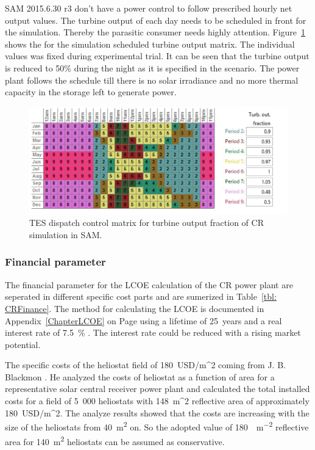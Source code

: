 SAM 2015.6.30 r3 don't have a power control to follow prescribed hourly net output values. The turbine output of each day needs to be scheduled in front for the simulation. Thereby the parasitic consumer needs highly attention. Figure~\ref{CR_turbineoutput} shows the for the simulation scheduled turbine output matrix. The individual values was fixed during experimental trial. It can be seen that the turbine output is reduced to 50\% during the night as it is specified in the scenario. The power plant follows the schedule till there is no solar irradiance and no more thermal capacity in the storage left to generate power. 
\begin{figure}[htbp]  
\centering
\includegraphics[width=0.95\linewidth]{FIG/CR_turbineoutput}
\caption[TES dispatch control matrix for turbine output fraction of CR simulation in SAM.]{TES dispatch control matrix for turbine output fraction of CR simulation in SAM.}\label{CR_turbineoutput}
\end{figure}
\pagebreak
\subsubsection{Financial parameter}
The financial parameter for the LCOE calculation of the CR power plant are seperated in different specific cost parts and are sumerized in Table~\ref{tbl: CRFinance}. The method for calculating the LCOE is documented in Appendix~\ref{ChapterLCOE} on Page \pageref{ChapterLCOE} using a lifetime of \SI{25}{years} and a real interest rate of 7.5~\% \cite{FraunhoferISE2013}. The interest rate could be reduced with a rising market potential.



The specific costs of the heliostat field of \SI{180}{USD/m}^2 coming from J. B. Blackmon \cite{Blackmon2012}. He analyzed the costs of heliostat as a function of area for a representative solar central receiver power plant and calculated the total installed costs for a field of 5~000 heliostats with \SI{148}{m}^2 reflective area of approximately \SI{180}{USD/m}^2. The analyze results showed that the costs are increasing with the size of the heliostats from \SI{40}{\square\metre} on. So the adopted value of \SI{180}{\usd\per\square\metre} reflective area for \SI{140}{\square\metre} heliostats can be assumed as conservative.


